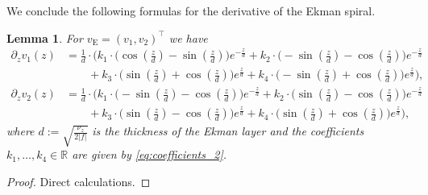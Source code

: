 \documentclass[preprint]{elsarticle}
\newtheorem{lem}[lem]{Lemma}
\numberwithin{equation}{section}
\newcommand {\R}	{\mathbb{R}}
\newcommand{\rE}{\mathrm{E}}
\begin{document}
We conclude the following formulas for the derivative of the Ekman spiral. 

\begin{lem}\label{lem:derative ekman_2}
	For $v_{\rE} = (v_1,v_2)^\top$ we have
	\begin{align*}
		\partial_z v_1(z) &= 
		\frac{1}{d} \cdot \biggl(
		k_1 \cdot \bigl( \cos(\tfrac{z}{d}) -\sin(\tfrac{z}{d}) \bigr) e^{-\tfrac{z}{d}}
		+
		k_2 \cdot \bigl( -\sin(\tfrac{z}{d}) -\cos(\tfrac{z}{d}) \bigr) e^{-\tfrac{z}{d}} \\
		&\qquad +
		k_3 \cdot \bigl( \sin(\tfrac{z}{d}) + \cos(\tfrac{z}{d}) \bigr) e^{\tfrac{z}{d}}
		+
		k_4 \cdot \bigl( -\sin(\tfrac{z}{d}) +\cos(\tfrac{z}{d}) \bigr) e^{\tfrac{z}{d}}
		\biggr),
		\\
		\partial_z v_2(z) &= 
		\frac{1}{d} \cdot \biggl(
		k_1 \cdot \bigl( -\sin(\tfrac{z}{d}) -\cos(\tfrac{z}{d}) \bigr) e^{-\tfrac{z}{d}}
		+
		k_2 \cdot \bigl( \sin(\tfrac{z}{d}) -\cos(\tfrac{z}{d}) \bigr) e^{-\tfrac{z}{d}} \\
		&\qquad +
		k_3 \cdot \bigl( \sin(\tfrac{z}{d}) -\cos(\tfrac{z}{d}) \bigr) e^{\tfrac{z}{d}}
		+
		k_4 \cdot \bigl(\sin(\tfrac{z}{d}) +\cos(\tfrac{z}{d}) \bigr) e^{\tfrac{z}{d}}
		\biggr),
	\end{align*}
	where $d := \sqrt{\frac{\nu_z}{2|f|}}$ is the thickness of the Ekman layer and
	the coefficients $k_1,\dots,k_4  \in \R$ are given by \eqref{eq:coefficients_2}.
\end{lem}
\begin{proof}
	Direct calculations.
\end{proof}
\end{document}
